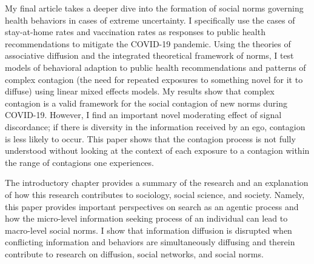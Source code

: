 My final article takes a deeper dive into the formation of social norms
governing health behaviors in cases of extreme uncertainty. I specifically use
the cases of stay-at-home rates and vaccination rates as responses to public
health recommendations to mitigate the COVID-19 pandemic. Using the theories of
associative diffusion and the integrated theoretical framework of norms, I test
models of behavioral adaption to public health recommendations and patterns of
complex contagion (the need for repeated exposures to something novel for it
to diffuse) using linear mixed effects models. My results show that complex
contagion is a valid framework for the social contagion of new norms during
COVID-19. However, I find an important novel moderating effect of signal
discordance; if there is diversity in the information received by an ego,
contagion is less likely to occur. This paper shows that the contagion process
is not fully understood without looking at the context of each exposure to a
contagion within the range of contagions one experiences.

The introductory chapter provides a summary of the research and an explanation
of how this research contributes to sociology, social science, and society.
Namely, this paper provides important perspectives on search as an agentic
process and how the micro-level information seeking process of an individual can
lead to macro-level social norms. I show that information diffusion is disrupted
when conflicting information and behaviors are simultaneously diffusing and
therein contribute to research on diffusion, social networks, and social norms.


